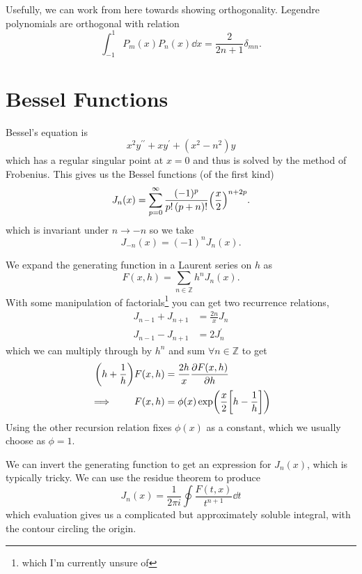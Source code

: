 \documentclass[a4paper,12pt,parskip=full,BCOR=1cm]{scrreprt}
\begin{document}
Usefully, we can work from here towards showing orthogonality.
Legendre polynomials are orthogonal with relation
$$\int_{-1}^{1}P_m(x)P_n(x)\dd{x}=\frac{2}{2n+1}\delta_{mn}.$$

\section{Bessel Functions}
Bessel's equation is
$$x^2y^{\prime\prime} + xy^\prime +(x^2-n^2)y$$ which has a regular singular point at $x=0$ and thus is solved by the method of Frobenius.
This gives us the Bessel functions (of the first kind)
\begin{equation*}
 J_n(x)= \sum_{p=0}^\infty \frac{(-1)^p}{p!\,(p+n)!}\qty(\frac{x}{2})^{n+2p}.
\end{equation*}
which is invariant under $n\rightarrow -n$ so we take
\begin{equation*}
 J_{-n}(x) = (-1)^nJ_n(x).
\end{equation*}

We expand the generating function in a Laurent series on $h$ as
\begin{equation*}
 F(x,h) = \sum_{n\in\mathbb{Z}} h^n J_n(x).
\end{equation*}
With some manipulation of factorials\footnote{which I'm currently unsure of}
you can get two recurrence relations,
\begin{align*}
 J_{n-1} + J_{n+1} & = \frac{2n}{x}J_n \\
 J_{n-1} - J_{n+1} & = 2 J_n^\prime
\end{align*}
which we can multiply through by $h^n$ and sum $\forall n \in \mathbb{Z}$ to get
\begin{align*}
 \qty(h + \frac{1}{h})F(x,h) & = \frac{2h}{x} \pdv{F(x,h)}{h}               \\
 \implies\qquad F(x,h)       & =\phi(x)\exp(\frac{x}{2}\qty[h-\frac{1}{h}])
\end{align*}
Using the other recursion relation fixes $\phi(x)$ as a constant, which we usually choose as $\phi=1$.

We can invert the generating function to get an expression for $J_n(x)$, which is typically tricky.
We can use the residue theorem to produce
\begin{equation*}
 J_n(x)=\frac{1}{2\pi i}\oint\frac{F(t,x)}{t^{n+1}}\dd{t}
\end{equation*}
which evaluation gives us a complicated but approximately soluble integral, with the contour circling the origin.
\end{document}
